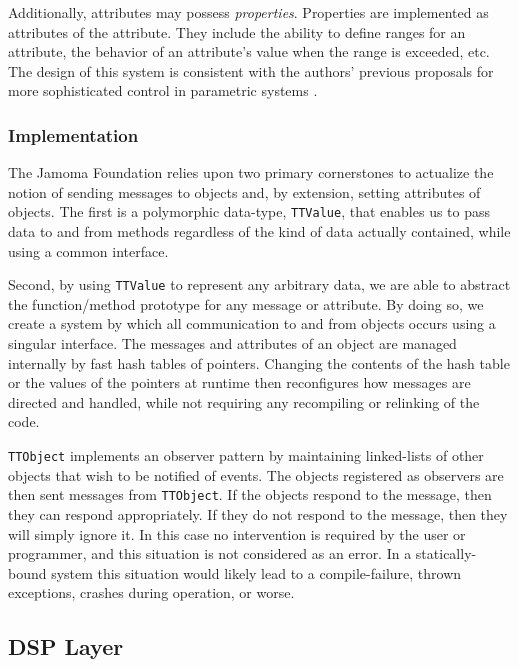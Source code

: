 \documentclass[twoside,10pt]{article}
\begin{document}
Additionally, attributes may possess \emph{properties}.  Properties are implemented as attributes of the attribute.  They include the ability to define ranges for an attribute, the behavior of an attribute's value when the range is exceeded, etc.  The design of this system is consistent with the authors' previous proposals for more sophisticated control in parametric systems \cite{Place:2008params}.

\subsubsection{Implementation}

The Jamoma Foundation relies upon two primary cornerstones to actualize the notion of sending messages to objects and, by extension, setting attributes of objects.  The first is a polymorphic data-type, \texttt{\small{TTValue}}, that enables us to pass data to and from methods regardless of the kind of data actually contained, while using a common interface.  %

Second, by using \texttt{\small{TTValue}} to represent any arbitrary data, we are able to abstract the function/method prototype for any message or attribute.  By doing so, we create a system by which all communication to and from objects occurs using a singular interface.  The messages and attributes of an object are managed internally by fast hash tables of pointers.  Changing the contents of the hash table or the values of the pointers at runtime then reconfigures how messages are directed and handled, while not requiring any recompiling or relinking of the code.

\texttt{\small{TTObject}} implements an observer pattern by maintaining linked-lists of other objects that wish to be notified of events.  The objects registered as observers are then sent messages from \texttt{\small{TTObject}}.  If the objects respond to the message, then they can respond appropriately.  If they do not respond to the message, then they will simply ignore it.  In this case no intervention is required by the user or programmer, and this situation is not considered as an error.  In a statically-bound system this situation would likely lead to a compile-failure, thrown exceptions, crashes during operation, or worse.



\subsection{DSP Layer} %
\end{document}
